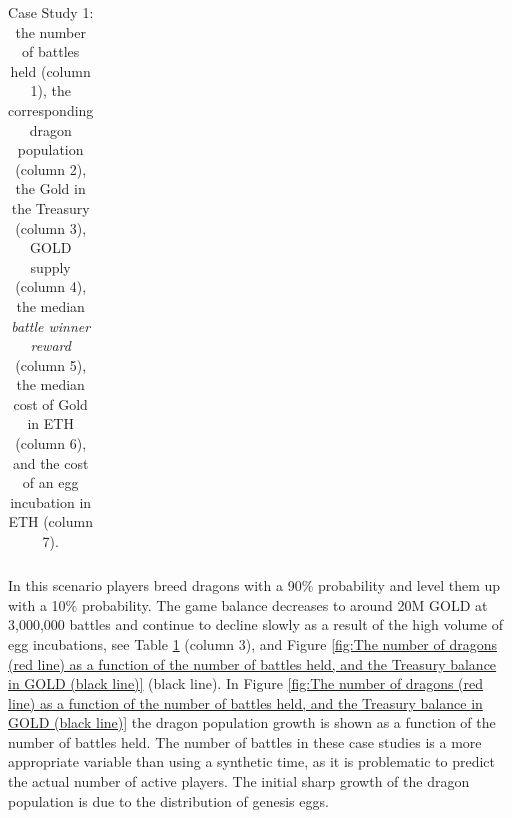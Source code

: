 \documentclass[12pt]{article}
\begin{document}
{\begin{table}[H]
\begin{tabular}{p{0.6in}p{0.64in}p{0.55in}p{0.55in}p{0.99in}p{0.9in}p{0.99in}}
\end{tabular}\caption{Case Study 1: the number of battles held (column 1), the corresponding dragon population (column 2), the Gold in the Treasury (column 3), GOLD supply (column 4), the median {\it battle winner reward} (column 5), the median cost of Gold in ETH (column 6), and the cost of an egg incubation in ETH (column 7).}
\label{tab:Table showing the number of battles held (column 1), the corresponding dragon population (column 2), the Gold in the Treasury (column 3), the median battle winner reward (column 4), the median cost of Gold in $ (column 5), and the cost of an egg incubation (column 6).  This information is provided for the three different cases studied below. }

 \end{table}




In this scenario players breed dragons with a 90$\%$  probability and level them up with a 10$\%$  probability. The game balance decreases to around 20M GOLD at 3,000,000 battles and continue to decline slowly as a result of the high volume of egg incubations, see  Table \ref{tab:Table showing the number of battles held (column 1), the corresponding dragon population (column 2), the Gold in the Treasury (column 3), the median battle winner reward (column 4), the median cost of Gold in $ (column 5), and the cost of an egg incubation (column 6).  This information is provided for the three different cases studied below. } (column 3), and Figure \ref{fig:The number of dragons (red line) as a function of the number of battles held, and the Treasury balance in GOLD (black line)} (black line). In Figure \ref{fig:The number of dragons (red line) as a function of the number of battles held, and the Treasury balance in GOLD (black line)} the dragon population growth is shown as a function of the number of battles held. The number of battles in these case studies is a more appropriate variable than using a synthetic time, as it is problematic to predict the actual number of active players. The initial sharp growth of the dragon population is due to the distribution of genesis eggs.\par




}
\end{document}
